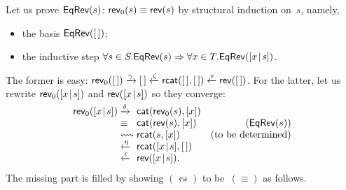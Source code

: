 Let us prove\label{EqRev} \(\textsf{EqRev}({s}) \colon
\textsf{rev}_0(s) \equiv
\textsf{rev}(s)\)
by
structural induction on~\(s\), namely,
\begin{itemize}

  \item the basis \(\textsf{EqRev}({[\,]})\);

  \item the inductive step \(\forall s \in S.\textsf{EqRev}({s})
    \Rightarrow \forall x \in T.\textsf{EqRev}({[{x}\!\mid\!{s}]})\).

\end{itemize}
The former is easy: \(\textsf{rev}_0([\,]) \xrightarrow{\smash{\gamma}}
[\,] \xleftarrow{\smash{\zeta}} \textsf{rcat}([\,],[\,])
\xleftarrow{\smash{\epsilon}}
\textsf{rev}([\,])\). For the latter, let us
rewrite \(\textsf{rev}_0([{x}\!\mid\!{s}])\) and
\(\textsf{rev}([{x}\!\mid\!{s}])\) so they converge:
\begin{equation*}
\begin{array}{@{}r@{\;}l@{\;}lr@{}}
  \fun{rev}_0(\cons{x}{s})
& \xrightarrow{\smash{\delta}}
& \fun{cat}(\fun{rev}_0(s),[x])\\
& \equiv
& \fun{cat}(\fun{rev}(s),[x])
& (\pred{EqRev}{s})\\
& \leftrightsquigarrow
& \fun{rcat}(s,[x])
& (\text{to be determined})\\
& \xleftarrow{\smash{\eta}}
& \fun{rcat}(\cons{x}{s},\el)\\
& \xleftarrow{\smash{\epsilon}}
& \fun{rev}(\cons{x}{s}).
\end{array}
\end{equation*}
The missing part is filled by showing \((\leftrightsquigarrow)\) to
be~\((\equiv)\) as follows.

